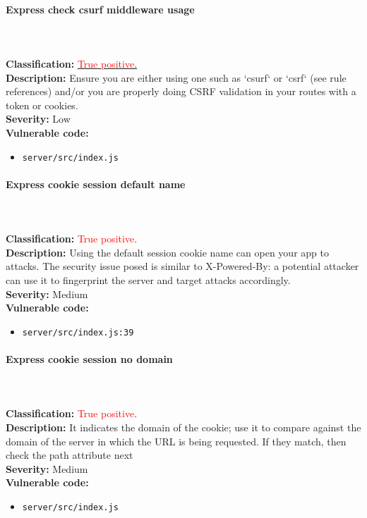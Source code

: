 \documentclass[]{article}
\begin{document}
\paragraph{Express check csurf middleware usage}  \mbox{} \\ \\
\textbf{Classification:} \hyperref[subsubsec:csrf_with_samesite_none_misconfiguration]{\textcolor{red}{True} \textcolor{red}{positive}.} \\ 
\textbf{Description:}  Ensure you are either using one such
          as `csurf` or `csrf` (see rule references) and/or you are properly doing CSRF validation in your    
          routes with a token or cookies.\\ 
\textbf{Severity:}  Low \\ 
\textbf{Vulnerable code:}
\begin{itemize}
    \item \texttt{server/src/index.js}
\end{itemize}


\paragraph{Express cookie session default name}  \mbox{} \\ \\
\textbf{Classification:} {\textcolor{red}{True} \textcolor{red}{positive}.} \\
\textbf{Description:} Using the default session cookie name can open your app to
          attacks. The security issue posed is similar to X-Powered-By: a potential attacker can use it to    
          fingerprint the server and target attacks accordingly. \\ 
\textbf{Severity:}  Medium \\ 
\textbf{Vulnerable code:}
\begin{itemize}
    \item \texttt{server/src/index.js:39}
\end{itemize}


\paragraph{Express cookie session no domain}  \mbox{} \\ \\
\textbf{Classification:} {\textcolor{red}{True} \textcolor{red}{positive}.} \\
\textbf{Description:} It indicates the domain of the cookie; use it
          to compare against the domain of the server in which the URL is being requested. If they match, then
          check the path attribute next \\ 
\textbf{Severity:}  Medium \\ 
\textbf{Vulnerable code:}
\begin{itemize}
    \item \texttt{server/src/index.js}
\end{itemize}
\end{document}
